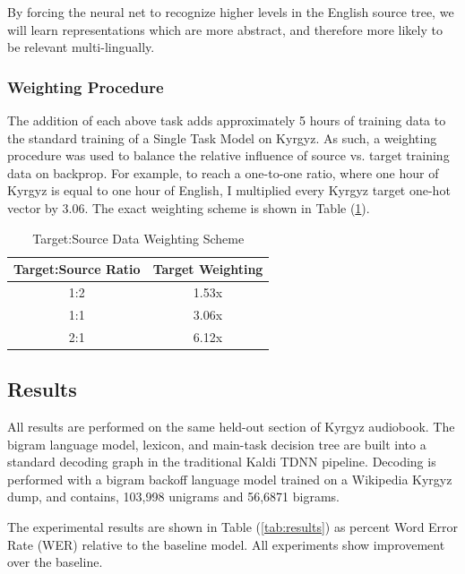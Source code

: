 \documentclass[a4paper]{article}
\begin{document}
By forcing the neural net to recognize higher levels in the English source tree, we will learn representations which are more abstract, and therefore more likely to be relevant multi-lingually. 


\subsubsection{Weighting Procedure}

The addition of each above task adds approximately 5 hours of training data to the standard training of a Single Task Model on Kyrgyz. As such, a weighting procedure was used to balance the relative influence of source vs. target training data on backprop. For example, to reach a one-to-one ratio, where one hour of Kyrgyz is equal to one hour of English, I multiplied every Kyrgyz target one-hot vector by $3.06$. The exact weighting scheme is shown in Table (\ref{tab:weights}).

\begin{table}[!htbp]
  \centering
  \caption{Target:Source Data Weighting Scheme}
  \label{tab:weights}
  \begin{adjustbox}{width=.3\textwidth}
    \begin{tabular}{cc}
      \toprule
      \textbf{Target:Source Ratio} & \textbf{Target Weighting}\\
      \midrule
      1:2 & 1.53x  \\
      1:1 & 3.06x  \\
      2:1 & 6.12x  \\
      \bottomrule
    \end{tabular}
  \end{adjustbox}
\end{table}




\subsection{Results}


All results are performed on the same held-out section of Kyrgyz audiobook. The bigram language model, lexicon, and main-task decision tree are built into a standard decoding graph in the traditional Kaldi TDNN pipeline. Decoding is performed with a bigram backoff language model trained on a Wikipedia Kyrgyz dump, and contains, 103,998 unigrams and 56,6871 bigrams.

The experimental results are shown in Table (\ref{tab:results}) as percent Word Error Rate (WER) relative to the baseline model. All experiments show improvement over the baseline.
\end{document}
